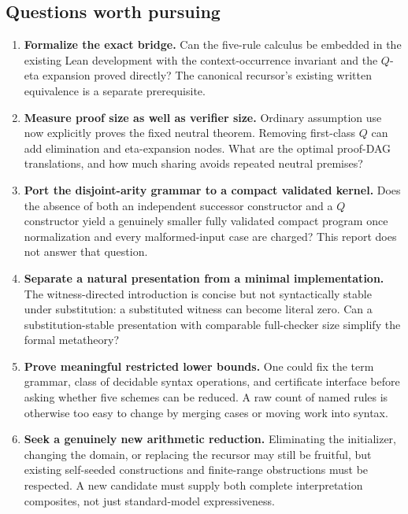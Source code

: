 \subsection{Questions worth pursuing}
\begin{enumerate}
\item \textbf{Formalize the exact bridge.} Can the five-rule calculus be embedded in the existing Lean development with the context-occurrence invariant and the $Q$-eta expansion proved directly? The canonical recursor's existing written equivalence is a separate prerequisite.
\item \textbf{Measure proof size as well as verifier size.} Ordinary assumption use now explicitly proves the fixed neutral theorem. Removing first-class $Q$ can add elimination and eta-expansion nodes. What are the optimal proof-DAG translations, and how much sharing avoids repeated neutral premises?
\item \textbf{Port the disjoint-arity grammar to a compact validated kernel.} Does the absence of both an independent successor constructor and a $Q$ constructor yield a genuinely smaller fully validated compact program once normalization and every malformed-input case are charged? This report does not answer that question.
\item \textbf{Separate a natural presentation from a minimal implementation.} The witness-directed introduction is concise but not syntactically stable under substitution: a substituted witness can become literal zero. Can a substitution-stable presentation with comparable full-checker size simplify the formal metatheory?
\item \textbf{Prove meaningful restricted lower bounds.} One could fix the term grammar, class of decidable syntax operations, and certificate interface before asking whether five schemes can be reduced. A raw count of named rules is otherwise too easy to change by merging cases or moving work into syntax.
\item \textbf{Seek a genuinely new arithmetic reduction.} Eliminating the initializer, changing the domain, or replacing the recursor may still be fruitful, but existing self-seeded constructions and finite-range obstructions must be respected. A new candidate must supply both complete interpretation composites, not just standard-model expressiveness.
\end{enumerate}
